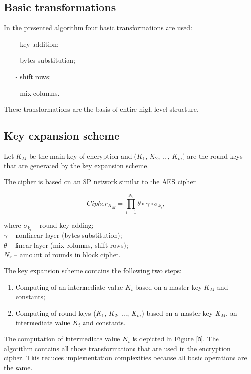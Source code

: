 \documentclass[a4paper,12pt]{spieman} %
\begin{document}
\subsection{Basic transformations}

In the presented algorithm four basic transformations are used:

\begin{itemize}
    \item[-] key addition;
    \item[-] bytes substitution;
    \item[-] shift rows;
    \item[-] mix columns.
\end{itemize}

These transformations are the basis of entire high-level structure.

\subsection{Key expansion scheme}

Let $K_M$ be the main key of encryption and ($K_1$, $K_2$, $\dots$, $K_m$) are the round keys that are generated by the key expansion scheme.

The cipher is based on an SP network similar to the AES cipher

$$Cipher_{K_M}=\prod_{i=1}^{N_r}\theta \circ \gamma \circ \sigma_{k_i},$$

\begin{flushleft}
where $\sigma_{k_i}$ – round key adding; \\
$\gamma$ – nonlinear layer (bytes substitution); \\
$\theta$ – linear layer (mix columns, shift rows); \\
$N_r$ – amount of rounds in block cipher.
\end{flushleft}

The key expansion scheme contains the following two steps:

\begin{enumerate}
    \item Computing of an intermediate value $K_t$ based on a master key $K_M$ and constants;
    \item Computing of round keys ($K_1$, $K_2$, $\dots$, $K_m$) based on a master key $K_M$, an intermediate value $K_t$ and constants.
\end{enumerate}

The computation of intermediate value $K_t$ is depicted in Figure \ref{5}. The algorithm contains all those transformations that are used in the encryption cipher. This reduces implementation complexities because all basic operations are the same.
\end{document}
